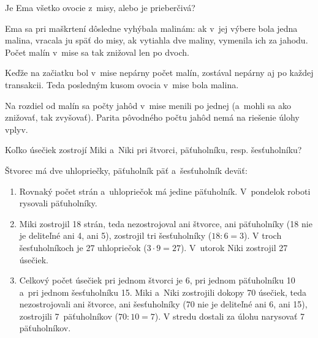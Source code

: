 {%
\napad
Je Ema všetko ovocie z~misy, alebo je prieberčivá?

\riesenie
Ema sa pri maškrtení dôsledne vyhýbala malinám:
ak v~jej výbere bola jedna malina, vracala ju späť do misy, ak vytiahla dve maliny, vymenila ich za jahodu.
Počet malín v~mise sa tak znižoval len po dvoch.

Keďže na začiatku bol v~mise nepárny počet malín, zostával nepárny aj po každej transakcii.
Teda posledným kusom ovocia v~mise bola malina.

\poznamka
Na rozdiel od malín sa počty jahôd v~mise menili po jednej (a~mohli sa ako znižovať, tak zvyšovať).
Parita pôvodného počtu jahôd nemá na riešenie úlohy vplyv.
}

{%
\napad
Koľko úsečiek zostrojí Miki a~Niki pri štvorci, päťuholníku, resp. šesťuholníku?

\riesenie
Štvorec má dve uhlopriečky, päťuholník päť a~šesťuholník deväť:
%


\begin{enumerate}
\item Rovnaký počet strán a~uhlopriečok má jedine päťuholník.
V~pondelok roboti rysovali päťuholníky.
\item Miki zostrojil 18 strán, teda nezostrojoval ani štvorce, ani päťuholníky (18 nie je deliteľné ani 4, ani 5), zostrojil tri šesťuholníky ($18:6=3$).
V troch šesťuholníkoch je 27 uhlopriečok ($3\cdot9=27$).
V~utorok Niki zostrojil 27 úsečiek.
\item Celkový počet úsečiek pri jednom štvorci je 6, pri jednom päťuholníku 10 a~pri jednom šesťuholníku 15.
Miki a~Niki zostrojili dokopy 70 úsečiek, teda nezostrojovali ani štvorce, ani šesťuholníky (70 nie je deliteľné ani 6, ani 15), zostrojili 7~päťuholníkov ($70:10=7$).
V stredu dostali za úlohu narysovať 7 päťuholníkov.
\end{enumerate}
}

